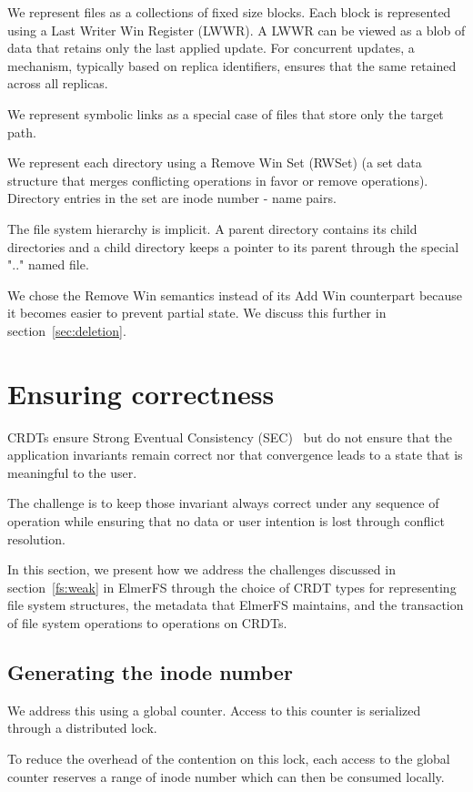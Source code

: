 \documentclass[sigconf,anonymous,10pt]{acmart}
\begin{document}
We represent files as a collections of fixed size blocks.
Each block is represented using a Last Writer Win Register (LWWR).
A LWWR can be viewed as a blob of data that retains only the last applied update.
For concurrent updates, a mechanism, typically based on replica identifiers,
ensures that the same retained across all replicas.

We represent symbolic links as a special case of files that store only
the target path.

We represent each directory using a Remove Win Set (RWSet) (a set data structure
that merges conflicting operations in favor or remove operations).
Directory entries in the set are inode number - name pairs.

The file system hierarchy is implicit. A parent directory contains its child
directories and a child directory keeps a pointer to its parent through
the special ".." named file.

We chose the Remove Win semantics instead of its Add Win counterpart because
it becomes easier to prevent partial state. We discuss this further
in section~\ref{sec:deletion}.

\section{Ensuring correctness}

CRDTs ensure Strong Eventual Consistency (SEC)~\cite{shapiro2011conflict} but
do not ensure that the application invariants remain correct
nor that convergence leads to a state that is meaningful
to the user.

The challenge is to keep those invariant always correct under any sequence
of operation while ensuring that no data or user intention is lost through
conflict resolution.

In this section,
we present how we address the challenges discussed in section~\ref{fs:weak}
in ElmerFS through the choice of CRDT types for representing file system structures,
the metadata that ElmerFS maintains, and the transaction of file system operations
to operations on CRDTs.

\subsection{Generating the inode number}
\label{sec:generation_inode_number}
We address this using a global counter. Access to this counter
is serialized through a distributed lock.

To reduce the overhead of the contention on this lock,
each access to the global counter reserves a range of inode number which
can then be consumed locally.
\end{document}
